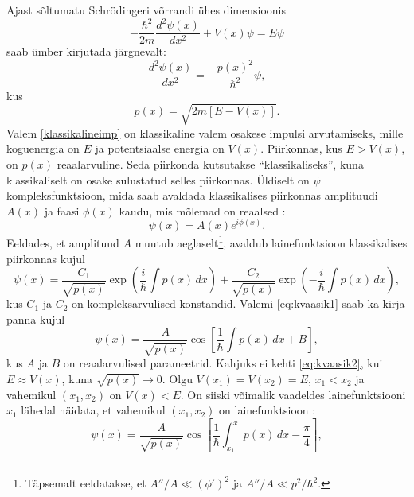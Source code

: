 \documentclass{trkut}%
\begin{document}
Ajast sõltumatu Schrödingeri võrrandi ühes dimensioonis
\begin{equation}
    -\frac{\hbar^2}{2m}\frac{d^2\psi(x)}{dx^2}+V(x)\psi=E\psi
\end{equation}
saab ümber kirjutada järgnevalt:
\begin{equation}
    \frac{d^2 \psi(x)}{dx^2}= - \frac{p(x)^2}{\hbar^2}\psi,
\end{equation}
kus
\begin{equation} \label{klassikalineimp}
    p(x) = \sqrt{2m[E-V(x)]}.
\end{equation}
Valem \eqref{klassikalineimp} on klassikaline valem osakese impulsi arvutamiseks, mille koguenergia on $E$ ja potentsiaalse energia on $V(x)$.
Piirkonnas, kus $E>V(x)$, on $p(x)$ reaalarvuline.
Seda piirkonda kutsutakse \enquote{klassikaliseks}, kuna klassikaliselt on osake sulustatud selles piirkonnas.
Üldiselt on $\psi$ kompleksfunktsioon, mida saab avaldada klassikalises piirkonnas amplituudi $A(x)$ ja faasi $\phi(x)$ kaudu, mis mõlemad on reaalsed \parencite[316]{griffiths05}:
\begin{equation}
    \psi(x)=A(x)e^{i\phi(x)}.
\end{equation}
Eeldades, et amplituud $A$ muutub aeglaselt\footnote{Täpsemalt eeldatakse, et $A''/A\ll(\phi ')^2$ ja $A''/A\ll p^2/\hbar^2$.}, avaldub lainefunktsioon klassikalises piirkonnas kujul \parencite[316-318]{griffiths05}
\begin{equation}
    \psi(x) = \frac{C_1}{\sqrt{p(x)}}\exp\left(\frac{i}{\hbar}\int p(x)\, dx\right) +\frac{C_2}{\sqrt{p(x)}}\exp\left(-\frac{i}{\hbar}\int p(x)\, dx\right),
    \label{eq:kvaasik1}
\end{equation}
kus $C_1$ ja $C_2$ on kompleksarvulised konstandid.
Valemi \eqref{eq:kvaasik1} saab ka kirja panna kujul \parencite[446]{shankar94}
\begin{equation}
    \psi(x)=\frac{A}{\sqrt{p(x)}} \cos \left[ \frac{1}{\hbar}\int p(x)\, dx + B \right],
    \label{eq:kvaasik2}
\end{equation}
kus $A$ ja $B$ on reaalarvulised parameetrid.
Kahjuks ei kehti \eqref{eq:kvaasik2}, kui $E \approx V(x)$, kuna $\sqrt{p(x)} \to 0$. Olgu $V(x_1)=V(x_2)=E$, $x_1<x_2$ ja vahemikul $(x_1, x_2)$ on $V(x)<E$.
On siiski võimalik vaadeldes lainefunktsiooni $x_1$ lähedal näidata, et vahemikul $(x_1, x_2)$ on lainefunktsioon \parencite[167-170]{landau05}:
\begin{equation}
    \psi(x)=\frac{A}{\sqrt{p(x)}} \cos \left[ \frac{1}{\hbar}\int_{x_1}^{x} p(x)\, dx - \frac{\pi}{4} \right],
\end{equation}
\end{document}
